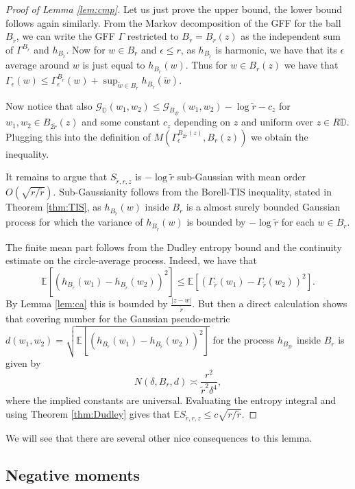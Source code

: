 \documentclass[11pt]{amsart}
\newcommand{\G}{\mathcal G}
\newcommand{\D}{\mathbb D}
\newcommand{\E}{\mathbb E}
\renewcommand{\1}{\mathbf 1}
\newcommand{\eps}{\epsilon}
\begin{document}
\begin{proof}[Proof of Lemma \ref{lem:cmp}]
Let us just prove the upper bound, the lower bound follows again similarly.
From the Markov decomposition of the GFF for the ball $B_{\tilde r}$, we can write the GFF $\Gamma$ restricted to $B_r = B_r(z)$ as the independent sum of $\Gamma^{B_{\tilde r}}$ and $h_{B_{\tilde r}}$. Now for $w \in B_r$ and $\eps \leq r$, as $h_{B_{\tilde r}}$ is harmonic, we have that its $\eps$ average around $w$ is just equal to $h_{B_{ \tilde r}}(w)$. Thus for $w \in B_r(z)$ we have that $\Gamma_\eps(w) \leq \Gamma_\eps^{B_{\tilde r}}(w) + \sup_{\tilde w \in B_r} h_{B_{\tilde r}}(\tilde w)$. 

Now notice that also $\G_{\D}(w_1,w_2) \leq \G_{B_{2\tilde r}}(w_1,w_2) - \log \tilde r - c_z$ for $w_1,w_2 \in B_{2\tilde r}(z)$ and some constant $c_z$ depending on $z$ and uniform over $z \in R\D$. Plugging this into the definition of $M(\Gamma_\eps^{B_{2\tilde r}(z)}, B_r(z))$ we obtain the inequality.

It remains to argue that $S_{\tilde r, r,z}$ is $-\log \tilde r$ sub-Gaussian with mean order $O(\sqrt{r/\tilde r})$. Sub-Gaussianity follows from the Borell-TIS inequality, stated in Theorem \ref{thm:TIS}, as $h_{B_{\tilde r}}(w)$ inside $B_r$ is a almost surely bounded Gaussian process for which the variance of $h_{B_{\tilde r}}(w)$ is bounded by $-\log \tilde r$ for each $w \in B_r$.

The finite mean part follows from the Dudley entropy bound and the continuity estimate on the circle-average process. Indeed, we have that
$$\E\left[(h_{B_{\tilde r}}(w_1) - h_{B_{\tilde r}}(w_2))^2\right] \leq \E\left[(\Gamma_{\tilde r}(w_1) - \Gamma_{\tilde r}(w_2))^2\right].$$
By Lemma \ref{lem:ca} this is bounded by $\frac{|z-w|}{\tilde r}$. But then a direct calculation shows that covering number for the Gaussian pseudo-metric $d(w_1, w_2) = \sqrt{\E\left[(h_{B_{\tilde r}}(w_1) - h_{B_{\tilde r}}(w_2))^2\right]}$ for the process $h_{B_{2 \tilde r}}$ inside $B_r$ is given by 
$$N(\delta,B_r,d) \asymp \frac{r^2}{\tilde r^2\delta^4},$$
where the implied constants are universal. Evaluating the entropy integral and using Theorem \ref{thm:Dudley} gives that $\E S_{\tilde r, r, z} \leq c\sqrt{r/\tilde r}$.

\end{proof}

We will see that there are several other nice consequences to this lemma.

\subsection{Negative moments}
\end{document}
